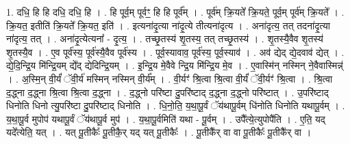 \documentclass[17pt]{extarticle}
\begin{document}
1. दधि॒ हि हि दधि॒ दधि॒ हि । . हि पूर्व॒म् पूर्वꣳ॒॒ हि हि पूर्व᳚म् । . पूर्व॑म् क्रि॒यते᳚ क्रि॒यते॒ पूर्व॒म् पूर्व॑म् क्रि॒यते᳚ । . क्रि॒यत॒ इतीति॑ क्रि॒यते᳚ क्रि॒यत॒ इति॑ । . इत्यना॑दृ॒त्या ना॑दृ॒त्ये तीत्यना॑दृत्य । . अना॑दृत्य॒ तत् तदना॑दृ॒त्या ना॑दृत्य॒ तत् । . अना॑दृ॒त्येत्यना᳚ - दृ॒त्य॒ । . तच्छृ॒तस्य॑ शृ॒तस्य॒ तत् तच्छृ॒तस्य॑ । . शृ॒तस्यै॒वैव शृ॒तस्य॑ शृ॒तस्यै॒व । . ए॒व पूर्व॑स्य॒ पूर्व॑स्यै॒वैव पूर्व॑स्य । . पूर्व॒स्यावाव॒ पूर्व॑स्य॒ पूर्व॒स्याव॑ । . अव॑ द्येद् द्ये॒दवाव॑ द्येत् । . द्ये॒दि॒न्द्रि॒य मि॑न्द्रि॒यम् द्ये᳚द् द्येदिन्द्रि॒यम् । . इ॒न्द्रि॒य मे॒वैवे न्द्रि॒य मि॑न्द्रि॒य मे॒व । . ए॒वास्मि॑न् नस्मिन् ने॒वैवास्मिन्न्॑ । . अ॒स्मि॒न् वी॒र्यं॑ ॅवी॒र्य॑ मस्मिन् नस्मिन् वी॒र्य᳚म् । . वी॒र्यꣳ॑ श्रि॒त्वा श्रि॒त्वा वी॒र्यं॑ ॅवी॒र्यꣳ॑ श्रि॒त्वा । . श्रि॒त्वा द॒द्ध्ना द॒द्ध्ना श्रि॒त्वा श्रि॒त्वा द॒द्ध्ना । . द॒द्ध्नो परि॑ष्टा दु॒परि॑ष्टाद् द॒द्ध्ना द॒द्ध्नो परि॑ष्टात् । . उ॒परि॑ष्टाद् धिनोति धिनो त्यु॒परि॑ष्टा दु॒परि॑ष्टाद् धिनोति । . धि॒नो॒ति॒ य॒था॒पू॒र्वं ॅय॑थापू॒र्वम् धि॑नोति धिनोति यथापू॒र्वम् । . य॒था॒पू॒र्व मुपोप॑ यथापू॒र्वं ॅय॑थापू॒र्व मुप॑ । . य॒था॒पू॒र्वमिति॑ यथा - पू॒र्वम् । . उपै᳚त्ये॒त्युपोपै॑ति । . ए॒ति॒ यद् यदे᳚त्येति॒ यत् । . यत् पू॒तीकैः᳚ पू॒तीकै॒र् यद् यत् पू॒तीकैः᳚ । . पू॒तीकै᳚र् वा वा पू॒तीकैः᳚ पू॒तीकै᳚र् वा । \newline
\end{document}

